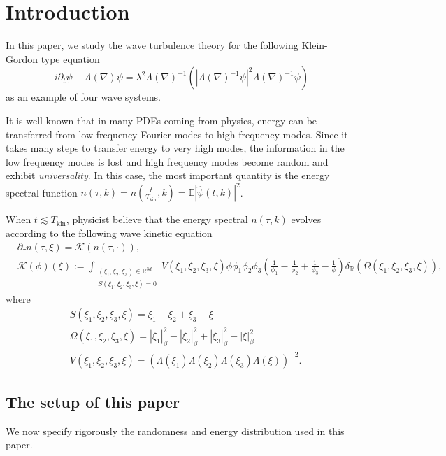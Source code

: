 \section{Introduction}
In this paper, we study the wave turbulence theory for the following Klein-Gordon type equation
\begin{equation}
    i\partial_t\psi-\Lambda(\nabla)\psi=\lambda^2 \Lambda(\nabla)^{-1}\left(|\Lambda(\nabla)^{-1}\psi|^2\Lambda(\nabla)^{-1}\psi\right)   
\end{equation}
as an example of four wave systems.

It is well-known that in many PDEs coming from physics, energy can be transferred from low frequency Fourier modes to high frequency modes. Since it takes many steps to transfer energy to very high modes, the information in the low frequency modes is lost and high frequency modes become random and exhibit \textit{universality}. In this case, the most important quantity is the energy spectral function $n(\tau,k) = n\left(\frac{t}{T_{\mathrm{kin}}}, k\right) = \mathbb E |\widehat \psi(t, k)|^2$.

When $t\lesssim T_{\text{kin}}$, physicist believe that the energy spectral $n(\tau, k)$ evolves according to the following wave kinetic equation
\[
\tag{WKE}\label{eq.WKE}
\begin{split}
&\partial_\tau n(\tau, \xi) =\mathcal K\left(n(\tau, \cdot)\right), 
\\
&\mathcal K(\phi)(\xi):= \int_{\substack{(\xi_1, \xi_2, \xi_3)\in \mathbb{R}^{3d}\\S(\xi_1,\xi_2,\xi_3,\xi)=0}} V(\xi_1,\xi_2,\xi_3,\xi)\phi \phi_1 \phi_2 \phi_3\left(\frac{1}{\phi_1}-\frac{1}{\phi_2}+\frac{1}{\phi_3}-\frac{1}{\phi}\right)\delta_{\mathbb{R}}(\Omega(\xi_1,\xi_2,\xi_3,\xi)),
\end{split}
\]
where 
\begin{equation}
    \begin{split}
        &S(\xi_1,\xi_2,\xi_3,\xi) = \xi_1-\xi_2+\xi_3-\xi
        \\
        &\Omega(\xi_1,\xi_2,\xi_3,\xi) = |\xi_1|_\beta^2-|\xi_2|_\beta^2+|\xi_3|_\beta^2-|\xi|_\beta^2
        \\
        &V(\xi_1,\xi_2,\xi_3,\xi) = \left(\Lambda(\xi_1)\Lambda(\xi_2)\Lambda(\xi_3)\Lambda(\xi)\right)^{-2}.
    \end{split}
\end{equation}


\subsection{The setup of this paper} We now specify rigorously the randomness and energy distribution used in this paper. 


